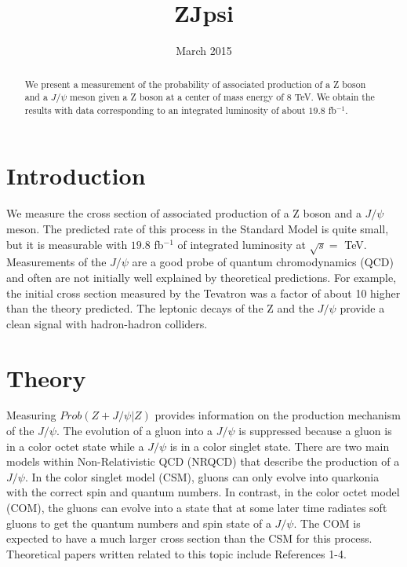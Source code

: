 \documentclass[a4paper,12pt]{article}
\begin{document}
 \sloppy
\title{ZJpsi}
\author{}
\date{March 2015}
\maketitle

\begin{abstract}
We present a measurement of the probability of associated production of a Z boson and a $J\slash \psi$ meson given a Z boson at a center of mass energy of 8 \unit{TeV}. We  obtain the results with data corresponding to an integrated luminosity of about $19.8$ fb$^{-1}$.
\end{abstract}

\section{Introduction}
We measure the cross section of associated production of a Z boson and a $J\slash \psi$ meson. The predicted rate of this process in the Standard Model is quite small, but it is measurable with $19.8$ fb$^{-1}$ of integrated luminosity at $\sqrt{s} =$ \unit[8]{TeV}. Measurements of the $J\slash \psi$ are a good probe of quantum chromodynamics (QCD) and often are not initially well explained by theoretical predictions. For example, the initial cross section measured by the Tevatron was a factor of about 10 higher than the theory predicted. The leptonic decays of the Z and the $J\slash \psi$ provide a clean signal with hadron-hadron colliders.

\section{Theory}
Measuring $Prob(Z + J\slash \psi | Z)$ provides information on the production mechanism of the $J\slash \psi$. The evolution of a gluon into a $J\slash \psi$ is suppressed because a gluon is in a color octet state while a $J\slash \psi$ is in a color singlet state. There are two main models within Non-Relativistic QCD (NRQCD) that describe the production of a $J\slash \psi$. In the color singlet model (CSM), gluons can only evolve into quarkonia with the correct spin and quantum numbers. In contrast, in the color octet model (COM), the gluons can evolve into a state that at some later time radiates soft gluons to get the quantum numbers and spin state of a $J\slash \psi$. The COM is expected to have a much larger cross section than the CSM for this process. Theoretical papers written related to this topic include References 1-4.
\end{document}
